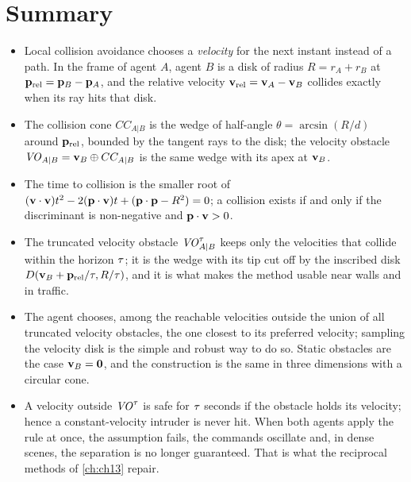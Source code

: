 \section{Summary}
\begin{summary}
\begin{itemize}
  \item Local collision avoidance chooses a \emph{velocity} for the next
  instant instead of a path. In the frame of agent $A$, agent $B$ is a disk of
  radius $R = r_A + r_B$ at $\mathbf{p}_{\mathrm{rel}} = \mathbf{p}_B - \mathbf{p}_A$, and the
  relative velocity $\mathbf{v}_{\mathrm{rel}} = \mathbf{v}_A - \mathbf{v}_B$ collides exactly
  when its ray hits that disk.
  \item The collision cone $CC_{A|B}$ is the wedge of half-angle
  $\theta = \arcsin(R/d)$ around $\mathbf{p}_{\mathrm{rel}}$, bounded by the tangent
  rays to the disk; the velocity obstacle $\mathit{VO}_{A|B} = \mathbf{v}_B \oplus CC_{A|B}$
  is the same wedge with its apex at $\mathbf{v}_B$.
  \item The time to collision is the smaller root of
  $(\mathbf{v}\cdot\mathbf{v})t^2 - 2(\mathbf{p}\cdot\mathbf{v})t + (\mathbf{p}\cdot\mathbf{p} - R^2) = 0$; a
  collision exists if and only if the discriminant is non-negative and
  $\mathbf{p}\cdot\mathbf{v} > 0$.
  \item The truncated velocity obstacle $\mathit{VO}^{\tau}_{A|B}$ keeps only the
  velocities that collide within the horizon $\tau$; it is the wedge with its
  tip cut off by the inscribed disk $D(\mathbf{v}_B + \mathbf{p}_{\mathrm{rel}}/\tau,R/\tau)$,
  and it is what makes the method usable near walls and in traffic.
  \item The agent chooses, among the reachable velocities outside the union of
  all truncated velocity obstacles, the one closest to its preferred velocity;
  sampling the velocity disk is the simple and robust way to do so. Static
  obstacles are the case $\mathbf{v}_B = \mathbf{0}$, and the construction is the same
  in three dimensions with a circular cone.
  \item A velocity outside $\mathit{VO}^{\tau}$ is safe for $\tau$ seconds if the
  obstacle holds its velocity; hence a constant-velocity intruder is never hit.
  When both agents apply the rule at once, the assumption fails, the commands
  oscillate and, in dense scenes, the separation is no longer guaranteed. That
  is what the reciprocal methods of \cref{ch:ch13} repair.
\end{itemize}
\end{summary}


